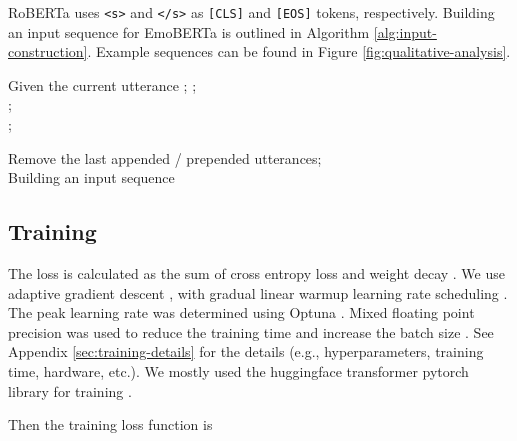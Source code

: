 \documentclass[11pt]{article}
\begin{document}
RoBERTa uses \texttt{<s>} and \texttt{</s>} as \texttt{[CLS]} and \texttt{[EOS]} tokens, respectively. Building an input sequence for EmoBERTa is outlined in Algorithm \ref{alg:input-construction}. Example sequences can be found in Figure \ref{fig:qualitative-analysis}.

\begin{algorithm}[h]
\SetAlgoLined

Given the current utterance ;
; \\
; \\
; \\


Remove the last appended / prepended utterances; \\


\caption{Building an input sequence\protect\footnotemark}
\label{alg:input-construction}
\end{algorithm}


\subsection{Training}

The loss is calculated as the sum of cross entropy loss and  weight decay \citep{10.5555/2986916.2987033}. We use adaptive gradient descent \citep{DBLP:journals/corr/KingmaB14}, \citep{DBLP:conf/iclr/LoshchilovH19} with gradual linear warmup learning rate scheduling \citep{DBLP:journals/corr/GoyalDGNWKTJH17}. The peak learning rate was determined using Optuna \citep{optuna_2019}. Mixed floating point precision was used to reduce the training time and increase the batch size \citep{DBLP:journals/corr/abs-1710-03740}. See Appendix \ref{sec:training-details} for the details (e.g., hyperparameters, training time, hardware, etc.). We mostly used the huggingface transformer pytorch library for training \citep{wolf-etal-2020-transformers}. 

Then the training loss function is
\end{document}
